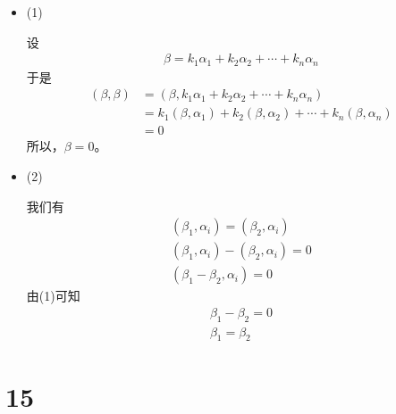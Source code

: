 \documentclass{article}
\begin{document}
\begin{itemize}
  \item (1)

        设
        \begin{align*}
          \beta = k_1 \alpha_1 + k_2 \alpha_2 + \cdots + k_n \alpha_n
        \end{align*}
        于是
        \begin{align*}
          (\beta, \beta)
           & = (\beta, k_1 \alpha_1 + k_2 \alpha_2 + \cdots + k_n \alpha_n)                \\
           & = k_1(\beta, \alpha_1) + k_2(\beta, \alpha_2) + \cdots + k_n(\beta, \alpha_n) \\
           & = 0
        \end{align*}
        所以，$\beta = 0$。

  \item (2)

        我们有
        \begin{align*}
          (\beta_1, \alpha_i) = (\beta_2, \alpha_i)     \\
          (\beta_1, \alpha_i) - (\beta_2, \alpha_i) = 0 \\
          (\beta_1 - \beta_2, \alpha_i) = 0
        \end{align*}
        由(1)可知
        \begin{align*}
          \beta_1 - \beta_2 = 0 \\
          \beta_1 = \beta_2
        \end{align*}
\end{itemize}

\section*{15}
\end{document}
